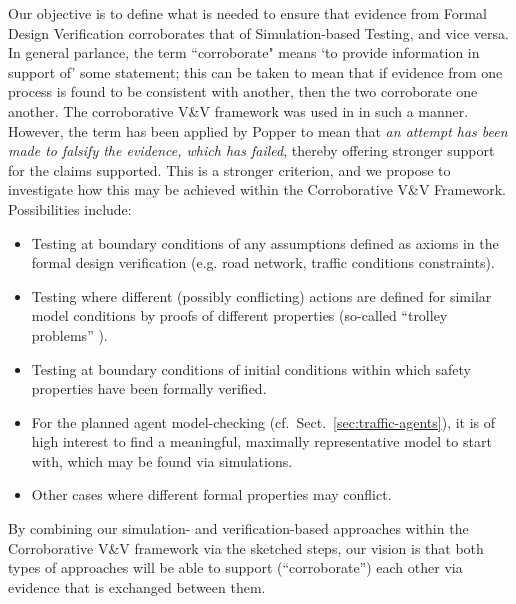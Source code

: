\documentclass[runningheads,twocolumn,a4paper,10pt]{llncs}
\newcommand{\pathToSourceFiles}{source}
\begin{document}
Our objective is to define what is needed to ensure that evidence from Formal Design Verification corroborates that of Simulation-based Testing, and vice versa. In general parlance, the term ``corroborate" means `to provide information in support of' some statement; this can be taken to mean that if evidence from one process is found to be consistent with another, then the two corroborate one another. The corroborative V\&V framework was used in \cite{corroborative-approach} in such a manner. However, the term has been applied by Popper \cite{popper1997logic} to mean that \emph{an attempt has been made to falsify the evidence, which has failed}, thereby offering stronger support for the claims supported. This is a stronger criterion, and we propose to investigate how this may be achieved within the Corroborative V\&V Framework. Possibilities include:
\begin{itemize}
    \item Testing at boundary conditions of any assumptions defined as axioms in the formal design verification (e.g. road network, traffic conditions constraints).
    \item Testing where different (possibly conflicting) actions are defined for similar model conditions by proofs of different properties (so-called ``trolley problems'' \cite{Bonnefon1573}). 
    \item Testing at boundary conditions of initial conditions within which safety properties have been formally verified.
    \item For the planned agent model-checking (cf.\ Sect.~\ref{sec:traffic-agents}), it is of high interest to find a meaningful, maximally representative model to start with, which may be found via simulations.
    \item Other cases where different formal properties may conflict.
\end{itemize}

By combining our simulation- and verification-based approaches within the Corroborative V\&V framework via the sketched steps, our vision is that both types of approaches will be able to support (``corroborate'') each other via evidence that is exchanged between them.

\balance

\printbibliography

% 
\end{document}
